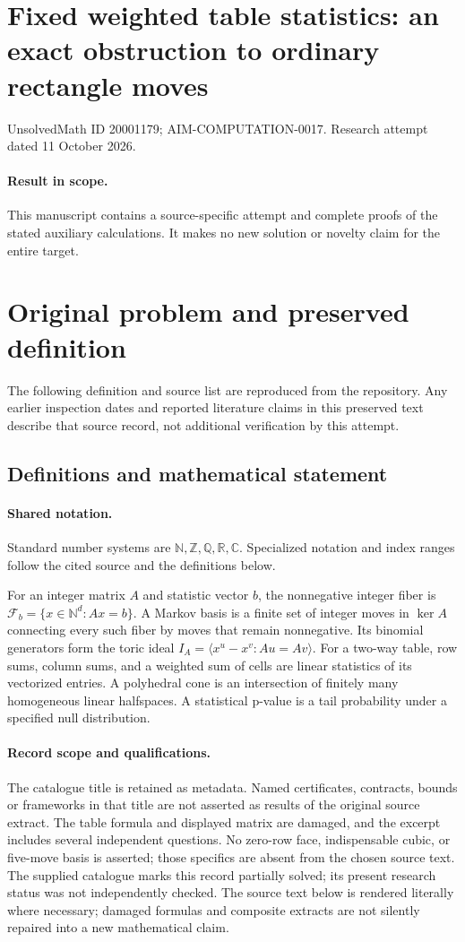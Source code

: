 \documentclass[11pt]{article}
\begin{document}
\section*{Fixed weighted table statistics: an exact obstruction to ordinary rectangle moves}
\noindent UnsolvedMath ID 20001179; AIM-COMPUTATION-0017. Research attempt dated 11 October 2026.
\paragraph{Result in scope.}This manuscript contains a source-specific attempt and complete proofs of the stated auxiliary calculations. It makes no new solution or novelty claim for the entire target.
\section{Original problem and preserved definition}
The following definition and source list are reproduced from the repository. Any earlier inspection dates and reported literature claims in this preserved text describe that source record, not additional verification by this attempt.
\subsection{Definitions and mathematical statement}

\paragraph{Shared notation.}Standard number systems are $\mathbb N,\mathbb Z,\mathbb Q,\mathbb R,\mathbb C$. Specialized notation and index ranges follow the cited source and the definitions below.


For an integer matrix $A$ and statistic vector $b$, the nonnegative integer fiber is $\mathcal F_b=\{x\in\mathbb N^d:Ax=b\}$. A Markov basis is a finite set of integer moves in $\ker A$ connecting every such fiber by moves that remain nonnegative. Its binomial generators form the toric ideal $I_A=\langle x^u-x^v:Au=Av\rangle$. For a two-way table, row sums, column sums, and a weighted sum of cells are linear statistics of its vectorized entries. A polyhedral cone is an intersection of finitely many homogeneous linear halfspaces. A statistical p-value is a tail probability under a specified null distribution.
\paragraph{Record scope and qualifications.}
The catalogue title is retained as metadata. Named certificates, contracts, bounds or frameworks in that title are not asserted as results of the original source extract.
The table formula and displayed matrix are damaged, and the excerpt includes several independent questions. No zero-row face, indispensable cubic, or five-move basis is asserted; those specifics are absent from the chosen source text. The supplied catalogue marks this record partially solved; its present research status was not independently checked.
The source text below is rendered literally where necessary; damaged formulas and composite extracts are not silently repaired into a new mathematical claim.
\end{document}

